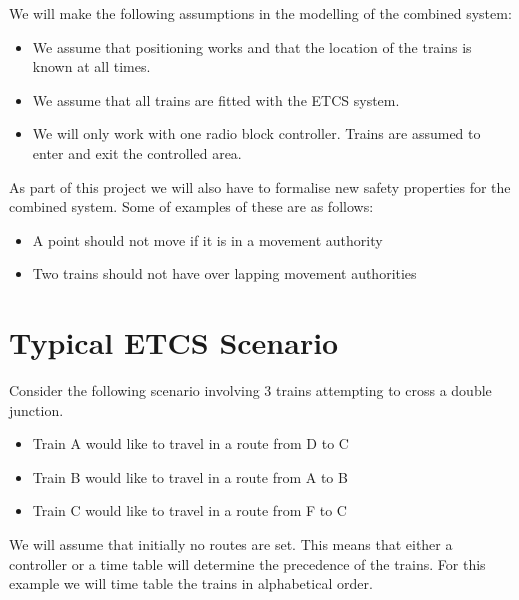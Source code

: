 We will make the following assumptions in the modelling of the combined system:

\begin{itemize}

\item We assume that positioning works and that the location of the trains is known at all times.

\item We assume that all trains are fitted with the ETCS system.

\item We will only work with one radio block controller. Trains are assumed to enter and exit the controlled area.


\end{itemize}

As part of this project we will also have to formalise new safety properties for the combined system. Some of examples of these are as follows:

\begin{itemize}

\item A point should not move if it is in a movement authority

\item Two trains should not have over lapping movement authorities

\end{itemize}


\section{Typical  ETCS Scenario}

Consider the following scenario involving 3 trains attempting to cross a double junction.

\begin{itemize}
\item Train A would like to travel in a route from D to C
\item Train B would like to travel in a route from A to B
\item Train C would like to travel in a route from F to C
\end{itemize}

We will assume that initially no routes are set. This means that either a controller or a time table will determine the precedence of the trains. 
For this example we will time table the trains in alphabetical order.



